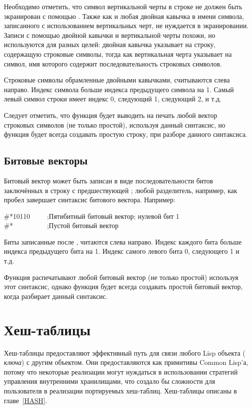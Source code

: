 Необходимо отметить, что символ вертикальной черты \cd{|} в строке не должен быть
экранирован с помощью \cd{{\Xbackslash}}. Также как и любая двойная кавычка в имени
символа, записанного с использованием вертикальных черт, не нуждается в
экранировании. Записи с помощью двойной кавычки и вертикальной черты похожи, но
используются для разных целей: двойная кавычка указывает на строку, содержащую
строковые символы, тогда как вертикальная черта указывает на символ, имя
которого содержит последовательность строковых символов.

Строковые символы обрамленные двойными кавычками, считываются слева
направо. Индекс символа больше индекса предыдущего символа на 1. Самый левый
символ строки имеет индекс 0, следующий 1, следующий 2, и т.д.

Следует отметить, что функция  будет выводить на печать любой вектор
строковых символов (не только простой), используя данный синтаксис, но функция
 будет всегда создавать простую строку, при разборе данного синтаксиса.

\subsection{Битовые векторы}

Битовый вектор может быть записан в виде последовательности битов заключённых в
строку с предшествующей \cd{\#*}; любой разделитель, например, как пробел
завершает синтаксис битового вектора.
Например:
\begin{lisp}
\#*10110~~~~~;\textrm{Пятибитный битовый вектор; нулевой бит 1} \\
\#*~~~~~~~~~~;\textrm{Пустой битовый вектор}
\end{lisp}

Биты записанные после \cd{\#*}, читаются слева направо. Индекс каждого бита
больше индекса предыдущего бита на 1. Индекс самого левого бита 0, следующего 1
и т.д.

Функция  распечатывают любой битовый вектор (не только простой)
используя этот синтаксис, однако функция  будет всегда создавать простой
битовый вектор, когда разбирает данный синтаксис.

\section{Хеш-таблицы}

Хеш-таблицы предоставляют эффективный путь для связи любого Lisp объекта ({\it
 ключа}) с другим объектом. Они предоставляются как примитивы Common Lisp'а,
потому что некоторые реализации могут нуждаться в использовании стратегий
управления внутренними хранилищами, что создало бы сложности для пользователя в
реализации портируемых хеш-таблиц.
Хеш-таблицы описаны в главе~\ref{HASH}.

